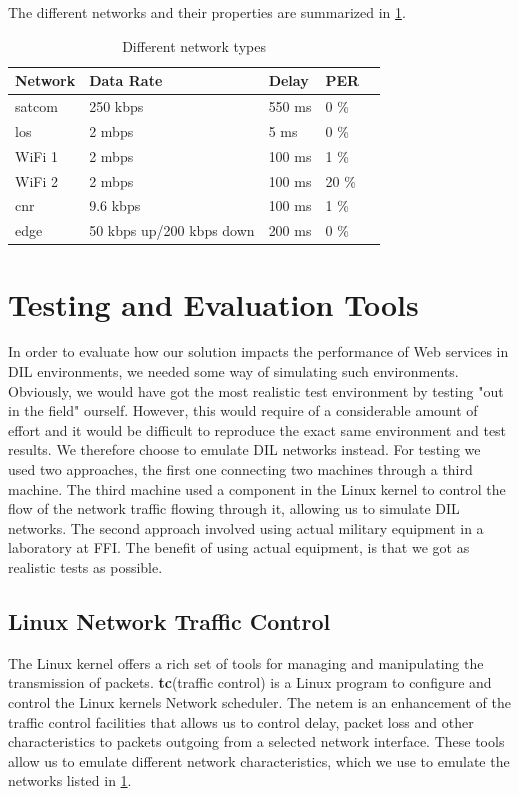 The different networks and their properties are summarized in
\cref{table-network-types}.

\begin{table}[h]
\begin{tabular}{| l | l | l | l | l |}
\hline
  \textbf{Network} & \textbf{Data Rate} & \textbf{Delay} & \textbf{PER} \\ \hline
  \gls{satcom} & 250 kbps & 550 ms & 0 \% \\ \hline
  \gls{los} & 2 mbps & 5 ms & 0 \% \\ \hline
  WiFi 1 & 2 mbps & 100 ms & 1 \% \\ \hline
  WiFi 2 & 2 mbps & 100 ms & 20 \% \\ \hline
  \gls{cnr} & 9.6 kbps & 100 ms & 1 \% \\ \hline
  \gls{edge} & 50 kbps up/200 kbps down & 200 ms & 0 \% \\ \hline
\end{tabular}
\caption{Different network types}
\label{table-network-types}
\end{table}


\section{Testing and Evaluation Tools}

In order to evaluate how our solution impacts the performance of Web services in
DIL environments, we needed some way of simulating such environments. Obviously,
we would have got the most realistic test environment by testing "out in the
field" ourself. However, this would require of a considerable amount of effort
and it would be difficult to reproduce the exact same environment and test
results. We therefore choose to emulate DIL networks instead. For testing we used
two approaches, the first one connecting two machines through a third machine.
The third machine used a component in the Linux kernel to control the flow
of the network traffic flowing through it, allowing us to simulate DIL networks.
The second approach involved using actual military equipment in a laboratory at
FFI. The benefit of using actual equipment, is that we got as realistic tests as
possible.


\subsection{Linux Network Traffic Control}

The Linux kernel offers a rich set of tools for managing and manipulating the
transmission of packets. \textbf{tc}(traffic control) is a Linux program to
configure and control the Linux kernels Network scheduler. The \gls{netem} is an
enhancement of the traffic control facilities that allows us to control delay,
packet loss and other characteristics to packets outgoing from a selected
network interface\cite{man-netem}. These tools allow us to emulate different
network characteristics, which we use to emulate the networks listed in
\cref{table-network-types}.

